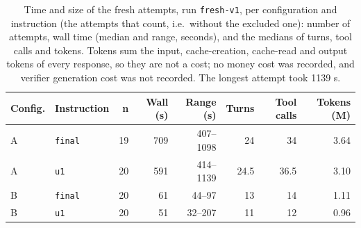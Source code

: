 \begin{table}[t]\centering\footnotesize
\caption{Time and size of the fresh attempts, run \texttt{fresh-v1}, per configuration and instruction (the attempts that count, i.e.\ without the excluded one): number of attempts, wall time (median and range, seconds), and the medians of turns, tool calls and tokens. Tokens sum the input, cache-creation, cache-read and output tokens of every response, so they are not a cost; no money cost was recorded, and verifier generation cost was not recorded. The longest attempt took 1139 s.}\label{tab:fresh-costs}
\begin{tabular}{llrrrrrr}\toprule Config. & Instruction & n & Wall (s) & Range (s) & Turns & Tool calls & Tokens (M) \\\midrule
A & \texttt{final} & 19 & 709 & 407--1098 & 24 & 34 & 3.64 \\
A & \texttt{u1} & 20 & 591 & 414--1139 & 24.5 & 36.5 & 3.10 \\
B & \texttt{final} & 20 & 61 & 44--97 & 13 & 14 & 1.11 \\
B & \texttt{u1} & 20 & 51 & 32--207 & 11 & 12 & 0.96 \\
\bottomrule\end{tabular}\end{table}

